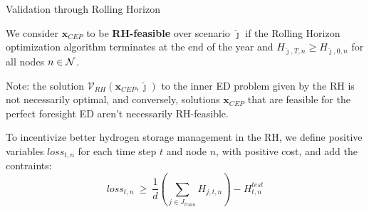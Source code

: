  \begin{frame}{Validation through Rolling Horizon}
    
    \begin{definition}
      We consider $\mathbf{x}_{CEP}$ to be \textbf{RH-feasible} over scenario $\hat{\jmath}$ if the Rolling Horizon optimization algorithm terminates at the end of the year and $H_{\hat{\jmath},T,n}\ge H_{\hat{\jmath},0,n}$ for all nodes $n\in\mathcal{N}$.
      \end{definition}
      \small
    Note: the solution $\mathcal{V}_{RH}(\mathbf{x}_{CEP},\hat{\jmath})$ to the inner ED problem given by the RH is not necessarily optimal, and conversely, solutions $\mathbf{x}_{CEP}$ that are feasible for the perfect foresight ED aren't necessarily RH-feasible.\vspace{1em}
    

    To incentivize better hydrogen storage management in the RH, we define positive variables $loss_{t,n}$ for each time step $t$ and node $n$, with positive cost, and add the contraints:
\begin{equation}
loss_{t,n}\ \ge\ \frac{1}{d}\left(\sum_{j\in J_{train}}H_{j,t,n}\right) - H^{test}_{t,n} 
\end{equation}
  \end{frame}


